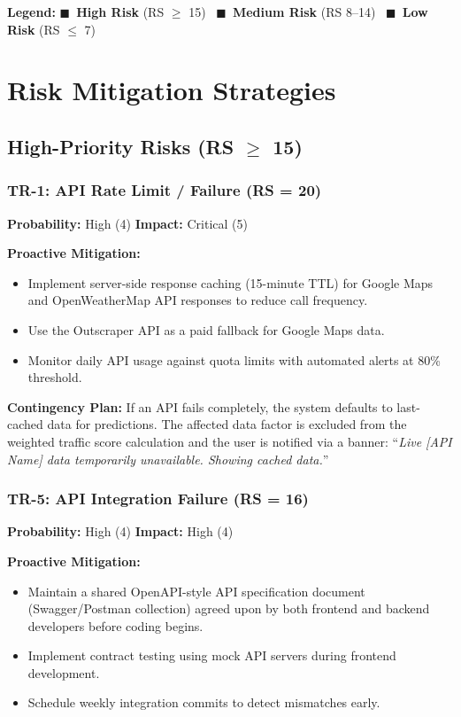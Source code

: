 \documentclass[12pt,a4paper]{article}
\begin{document}
\bigskip
\noindent\textbf{Legend:}
\textcolor{highRisk}{$\blacksquare$}~\textbf{High Risk} (RS $\geq$ 15)~\quad
\textcolor{medRisk}{$\blacksquare$}~\textbf{Medium Risk} (RS 8--14)~\quad
\textcolor{lowRisk}{$\blacksquare$}~\textbf{Low Risk} (RS $\leq$ 7)

\section{Risk Mitigation Strategies}

\subsection{High-Priority Risks (RS $\geq$ 15)}

\subsubsection*{TR-1: API Rate Limit / Failure (RS = 20)}
\textbf{Probability:} High (4) \quad \textbf{Impact:} Critical (5)

\textbf{Proactive Mitigation:}
\begin{itemize}[noitemsep]
    \item Implement server-side response caching (15-minute TTL) for Google Maps and OpenWeatherMap API responses to reduce call frequency.
    \item Use the Outscraper API as a paid fallback for Google Maps data.
    \item Monitor daily API usage against quota limits with automated alerts at 80\% threshold.
\end{itemize}

\textbf{Contingency Plan:}
If an API fails completely, the system defaults to last-cached data for predictions. The affected data factor is excluded from the weighted traffic score calculation and the user is notified via a banner: ``\textit{Live [API Name] data temporarily unavailable. Showing cached data.}''

\bigskip
\subsubsection*{TR-5: API Integration Failure (RS = 16)}
\textbf{Probability:} High (4) \quad \textbf{Impact:} High (4)

\textbf{Proactive Mitigation:}
\begin{itemize}[noitemsep]
    \item Maintain a shared OpenAPI-style API specification document (Swagger/Postman collection) agreed upon by both frontend and backend developers before coding begins.
    \item Implement contract testing using mock API servers during frontend development.
    \item Schedule weekly integration commits to detect mismatches early.
\end{itemize}
\end{document}
